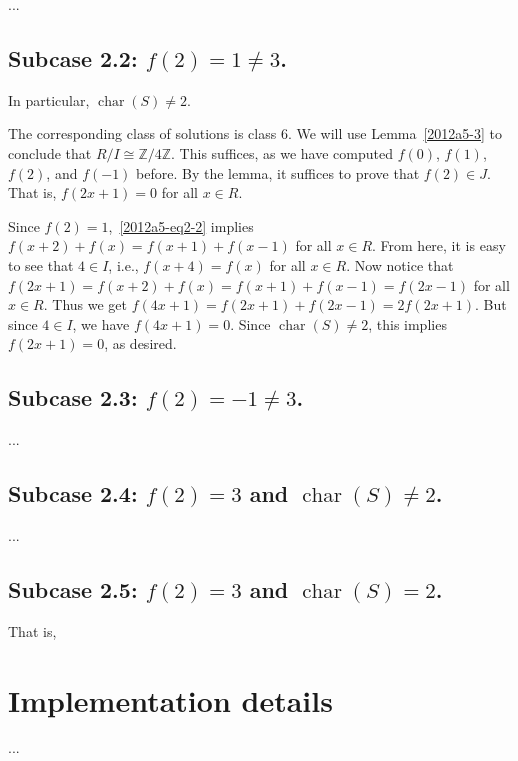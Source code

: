 \documentclass{article}
\newcommand{\Z}{\mathbb{Z}}
\DeclareMathOperator{\rchar}{char}
\begin{document}
...



\subsection*{Subcase 2.2: $f(2) = 1 \neq 3$.}

In particular, $\rchar(S) \neq 2$.

The corresponding class of solutions is class 6.
We will use Lemma~\ref{2012a5-3} to conclude that $R/I \cong \Z/4\Z$.
This suffices, as we have computed $f(0)$, $f(1)$, $f(2)$, and $f(-1)$ before.
By the lemma, it suffices to prove that $f(2) \in J$.
That is, $f(2x + 1) = 0$ for all $x \in R$.

Since $f(2) = 1$,~\eqref{2012a5-eq2-2} implies $f(x + 2) + f(x) = f(x + 1) + f(x - 1)$ for all $x \in R$.
From here, it is easy to see that $4 \in I$, i.e., $f(x + 4) = f(x)$ for all $x \in R$.
Now notice that $f(2x + 1) = f(x + 2) + f(x) = f(x + 1) + f(x - 1) = f(2x - 1)$ for all $x \in R$.
Thus we get $f(4x + 1) = f(2x + 1) + f(2x - 1) = 2 f(2x + 1)$.
But since $4 \in I$, we have $f(4x + 1) = 0$.
Since $\rchar(S) \neq 2$, this implies $f(2x + 1) = 0$, as desired.


\subsection*{Subcase 2.3: $f(2) = -1 \neq 3$.}

...


\subsection*{Subcase 2.4: $f(2) = 3$ and $\rchar(S) \neq 2$.}

...


\subsection*{Subcase 2.5: $f(2) = 3$ and $\rchar(S) = 2$.}

That is, 


\section*{Implementation details}

...
\end{document}
